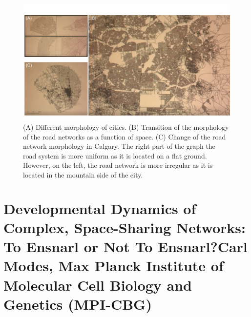 \documentclass[12pt,a4paper]{article}
\begin{document}
	\begin{figure}[h!]
		\centering
		\includegraphics[width=0.7\linewidth]{ClaireTalk.png}
		\caption{(A) Different morphology of cities. (B) Transition of the morphology of the road networks as a function of space. (C) Change of the road network morphology in Calgary. The right part of the graph the road system is more uniform as it is located on a flat ground. However, on the left, the road network is more irregular as it is located in the mountain side of the city.}
	\end{figure}
	
	\FloatBarrier
	
	\section{Developmental Dynamics of Complex, Space-Sharing Networks: To Ensnarl or Not To Ensnarl?Carl Modes, Max Planck Institute of Molecular Cell Biology and Genetics (MPI-CBG)}
	
\end{document}
